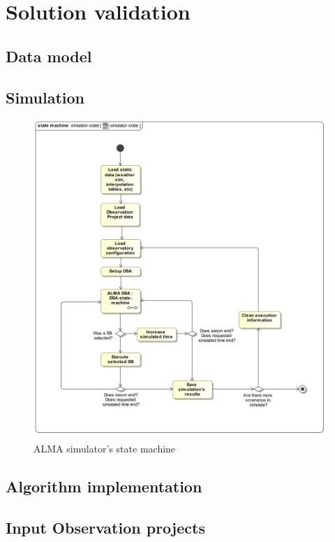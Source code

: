 \chapter{Solution validation}

\section {Data model}

\section {Simulation}

\begin{figure}[h]	
\begin{center}
\includegraphics[width=\textwidth]{images/simulator-state-machine}
\caption{ALMA simulator's state machine}
\end{center}
\label{fig:sim-state-machine}
\end{figure}

\section {Algorithm implementation}

\section {Input Observation projects}